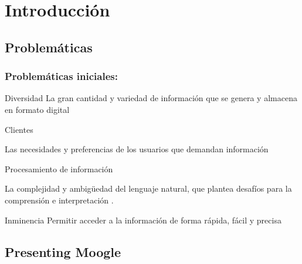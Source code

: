 \section*{Introducción}

\begin{frame}
    
    \subsection*{Problemáticas}
\frametitle{Problemáticas iniciales:}
\begin{block}{Diversidad}
    La gran cantidad y variedad de información que se genera y almacena en formato digital

\end{block}    
  \begin{block}{Clientes}
    
    Las necesidades y preferencias de los usuarios que demandan información

  \end{block}  
  \begin{block}{Procesamiento de información}
    
    La complejidad y ambigüedad del lenguaje natural, que plantea desafíos para la comprensión e interpretación
.
  \end{block} 
  \begin{block}{Inminencia}
    Permitir acceder a la información de forma rápida, fácil y precisa   
  \end{block}
\end{frame}


\subsection*{Presenting Moogle}


